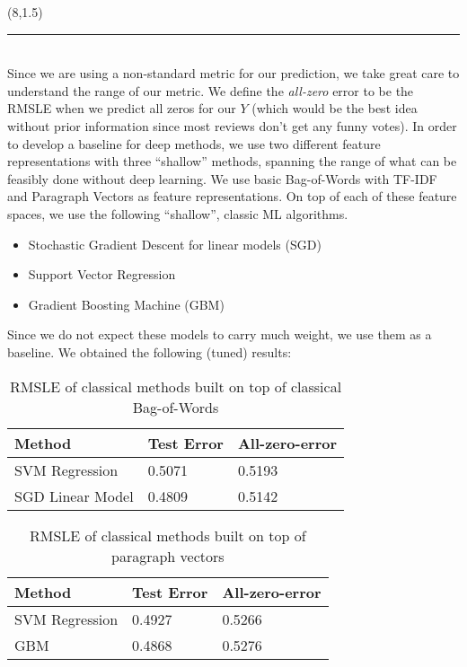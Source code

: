 \documentclass[a0]{a0poster}
\def\Head#1{\noindent{\LARGE\color{bluegray} #1}\bigskip}
\begin{document}
\begin{textblock}{7.0}(8,1.5)
\hrule\medskip
\Head{Baselines}\\
Since we are using a non-standard metric for our prediction, we take great care to understand the range of our metric. We define the \emph{all-zero} error to be the RMSLE when we predict all zeros for our $Y$ (which would be the best idea without prior information since most reviews don't get any funny votes). In order to develop a baseline for deep methods, we use two different feature representations with three ``shallow'' methods, spanning the range of what can be feasibly done without deep learning. We use basic Bag-of-Words with TF-IDF and Paragraph Vectors as feature representations. On top of each of these feature spaces, we use the following ``shallow'', classic ML algorithms.

\begin{itemize}
    \item Stochastic Gradient Descent for linear models (SGD)
    \item Support Vector Regression
    \item Gradient Boosting Machine (GBM)
\end{itemize}

Since we do not expect these models to carry much weight, we use them as a baseline. We obtained the following (tuned) results:

\begin{table}[h]
\centering
\vspace{2ex}
\begin{tabular}{l l l}
\textbf{Method} & \textbf{Test Error} & \textbf{All-zero-error}\tabularnewline
\hline
SVM Regression & 0.5071 & 0.5193\tabularnewline
\hline
SGD Linear Model & 0.4809 & 0.5142\tabularnewline
\hline
\end{tabular}
\caption{RMSLE of classical methods built on top of classical Bag-of-Words}
\end{table}

\begin{table}[h]
\centering
\vspace{2ex}
\begin{tabular}{l l l}
\textbf{Method} & \textbf{Test Error} & \textbf{All-zero-error}\tabularnewline
\hline
SVM Regression & 0.4927 & 0.5266\tabularnewline
\hline
GBM & 0.4868 & 0.5276\tabularnewline
\hline
\end{tabular}
\caption{RMSLE of classical methods built on top of paragraph vectors}
\end{table}


\end{textblock}
\end{document}
